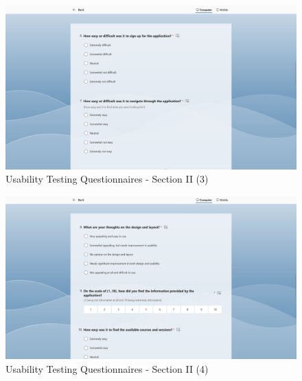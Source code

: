 \begin{justify}
\begin{figure}[H]
    \centerline{\includegraphics[width=150mm,scale=1]{figures/implementation_and_testing/testing/MUT/questions/Questions (5).png}}
    \caption{Usability Testing Questionnaires - Section II (3)}
    \label{Usability Testing Questionnaires - Section II (3)}
\end{figure}

\begin{figure}[H]
    \centerline{\includegraphics[width=150mm,scale=1]{figures/implementation_and_testing/testing/MUT/questions/Questions (6).png}}
    \caption{Usability Testing Questionnaires - Section II (4)}
    \label{Usability Testing Questionnaires - Section II (4)}
\end{figure}


\end{justify}
